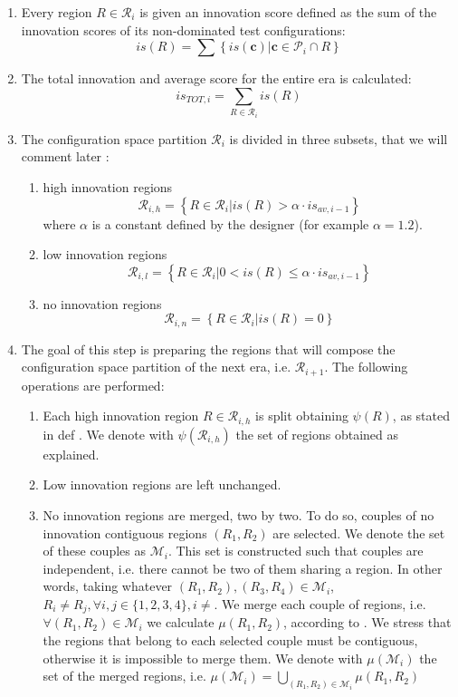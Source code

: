 \begin{enumerate}
\item Every region $R\in\mathcal{R}_{i}$ is given an innovation score defined
as the sum of the innovation scores of its non-dominated test configurations:
	\[
	is\left(R\right)=\sum\left\{ \left.is\left(\mathbf{c}\right)\right|\mathbf{c}\in\mathscr{P}_{i}\cap R\right\} 
	\]

\item The total innovation and average score for the entire era is calculated:
	\[
	is_{TOT,i}=\sum_{R\in\mathcal{R}_{i}}is\left(R\right)
	\]


\item The configuration space partition $\mathcal{R}_{i}$ is divided in three subsets, that we will comment later :

	\begin{enumerate}
	\item high innovation regions 
	\[
	\mathcal{R}_{i,h}=\left\{ \left.R\in\mathcal{R}_{i}\right|is\left(R\right)>\alpha\cdot is_{av,i-1}\right\} 
	\]
	 where $\alpha$ is a constant defined by the designer (for example
	$\alpha=1.2$). 
	\item low innovation regions 
	\[
	\mathcal{R}_{i,l}=\left\{ \left.R\in\mathcal{R}_{i}\right|0<is\left(R\right)\le\alpha\cdot is_{av,i-1}\right\} 
	\]
	\item no innovation regions 
	\[
	\mathcal{R}_{i,n}=\left\{ \left.R\in\mathcal{R}_{i}\right|is\left(R\right)=0\right\} 
	\]
	\end{enumerate}

\item The goal of this step is preparing the regions that will compose the configuration space partition of the next era, i.e. $\mathscr{R}_{i+1}$. The following operations are performed:
	\begin{enumerate}
		\item Each high innovation region $R\in\mathscr{R}_{i,h}$ is split obtaining $\psi(R)$, as stated in def . We denote with $\psi\left(\mathscr{R}_{i,h}\right)$ the set of regions obtained as explained.
		\item Low innovation regions are left unchanged.
		\item No innovation regions are merged, two by two. To do so, couples of no innovation contiguous regions $(R_1,R_2)$ are selected. We denote the set of these couples as $\mathscr{M}_i$. This set is constructed such that couples are independent, i.e. there cannot be two of them sharing a region. In other words, taking whatever $(R_1,R_2),(R_3,R_4) \in \mathscr{M}_i$, $R_i \neq R_j, \forall i,j\in\lbrace1,2,3,4\rbrace, i\neq$. 
We merge each couple of regions, i.e. $\forall (R_1,R_2)\in\mathscr{M}_i$ we calculate $\mu(R_1,R_2)$, according to .
We stress that the regions that belong to each selected couple must be contiguous, otherwise it is impossible to merge them. We denote with $\mu(\mathscr{M}_i)$ the set of the merged regions, i.e. $\mu(\mathscr{M}_i) = \bigcup_{(R_1,R_2)\in\mathscr{M}_i} \mu(R_1,R_2)$
	\end{enumerate}



\end{enumerate}
